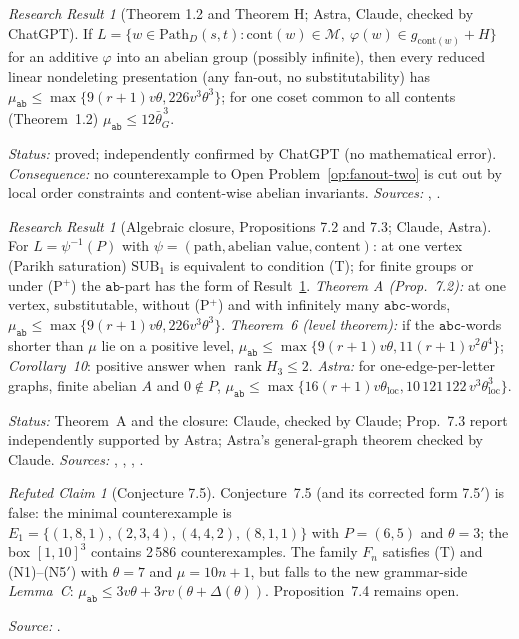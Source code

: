 \documentclass[11pt]{article}
\numberwithin{equation}{section}
\theoremstyle{plain}
\theoremstyle{definition}
\theoremstyle{remark}
\newtheorem{rresult}[theorem]{Research Result}
\newtheorem{rrefuted}[theorem]{Refuted Claim}
\theoremstyle{plain}
\begin{document}
\begin{rresult}[Theorem 1.2 and Theorem H; Astra, Claude, checked by ChatGPT]
\label{rr:theorem-H}
If $L=\{w\in\mathrm{Path}_D(s,t):\mathrm{cont}(w)\in\mathcal M,\ \varphi(w)\in g_{\mathrm{cont}(w)}+H\}$
for an additive $\varphi$ into an abelian group (possibly infinite), then every
reduced linear nondeleting presentation (any fan-out, no substitutability) has
$\mu_{\mathtt{ab}}\le\max\{9(r+1)v\theta,226v^3\theta^3\}$; for one coset common to all
contents (Theorem~1.2) $\mu_{\mathtt{ab}}\le12\bar\theta_G^{\,3}$.
\end{rresult}
\noindent\emph{Status:} proved; independently confirmed by ChatGPT (no mathematical
error).  \emph{Consequence:} no counterexample to Open Problem~\ref{op:fanout-two}
is cut out by local order constraints and content-wise abelian invariants.
\emph{Sources:} ,
.

\begin{rresult}[Algebraic closure, Propositions 7.2 and 7.3; Claude, Astra]
\label{rr:closure}
For $L=\psi^{-1}(P)$ with $\psi=(\text{path},\text{abelian value},\text{content})$:
at one vertex (Parikh saturation) $\mathrm{SUB}_1$ is equivalent to condition (T);
for finite groups or under (P$^+$) the $\mathtt{ab}$-part has the form of
Result~\ref{rr:theorem-H}.  \emph{Theorem A (Prop.~7.2):} at one vertex, substitutable,
without (P$^+$) and with infinitely many $\mathtt{abc}$-words,
$\mu_{\mathtt{ab}}\le\max\{9(r+1)v\theta,226v^3\theta^3\}$.  \emph{Theorem~6 (level theorem):}
if the $\mathtt{abc}$-words shorter than $\mu$ lie on a positive level,
$\mu_{\mathtt{ab}}\le\max\{9(r+1)v\theta,11(r+1)v^2\theta^4\}$; \emph{Corollary~10}:
positive answer when $\operatorname{rank}H_3\le2$.  \emph{Astra:} for one-edge-per-letter
graphs, finite abelian $A$ and $0\notin P$,
$\mu_{\mathtt{ab}}\le\max\{16(r+1)v\theta_{\mathrm{loc}},10\,121\,122\,v^3\theta_{\mathrm{loc}}^3\}$.
\end{rresult}
\noindent\emph{Status:} Theorem~A and the closure: Claude, checked by Claude; Prop.~7.3
report independently supported by Astra; Astra's general-graph theorem checked by
Claude.  \emph{Sources:} , ,
, .

\begin{rrefuted}[Conjecture 7.5]
\label{rf:conj75}
Conjecture~7.5 (and its corrected form 7.5$'$) is false: the minimal counterexample
is $E_1=\{(1,8,1),(2,3,4),(4,4,2),(8,1,1)\}$ with $P=(6,5)$ and $\theta=3$; the box
$[1,10]^3$ contains 2\,586 counterexamples.  The family $F_n$ satisfies (T) and
(N1)--(N5$'$) with $\theta=7$ and $\mu=10n+1$, but falls to the new grammar-side
\emph{Lemma~C}: $\mu_{\mathtt{ab}}\le3v\theta+3rv(\theta+\Delta(\theta))$.
Proposition~7.4 remains open.
\end{rrefuted}
\noindent\emph{Source:} .
\end{document}
